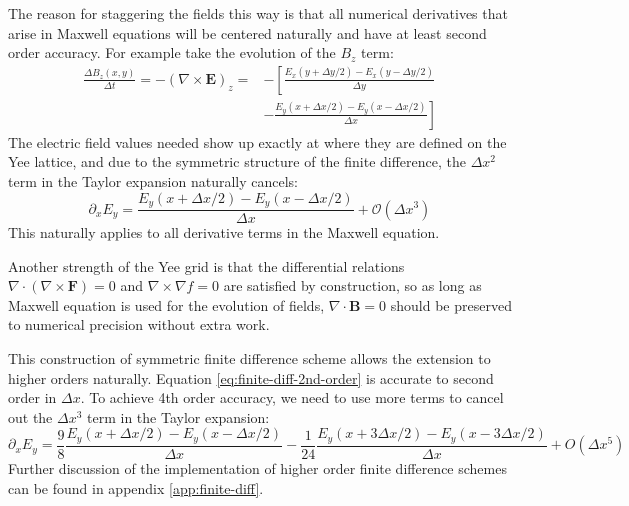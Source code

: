 The reason for staggering the fields this way is that all numerical derivatives
that arise in Maxwell equations will be centered naturally and have at least
second order accuracy. For example take the evolution of the $B_z$ term:
\begin{equation}
  \begin{split}
    \frac{\Delta B_z(x, y)}{\Delta t} = -(\nabla\times \mathbf{E})_{z} = &-\left[ \frac{E_x(y + \Delta y/2) - E_x(y - \Delta y/2)}{\Delta y} \right. \\
      &- \left.\frac{E_y(x + \Delta x/2) - E_y(x - \Delta x/2)}{\Delta x} \right]
  \end{split}
\end{equation}
The electric field values needed show up exactly at where they are defined on
the Yee lattice, and due to the symmetric structure of the finite difference,
the $\Delta x^{2}$ term in the Taylor expansion naturally cancels:
\begin{equation}
  \label{eq:finite-diff-2nd-order}
\partial_xE_y = \frac{E_y(x + \Delta x/2) - E_y(x - \Delta x/2)}{\Delta x} + \mathcal{O}(\Delta x^3)
\end{equation}
This naturally applies to all derivative terms in the Maxwell equation.

Another strength of the Yee grid is that the differential relations
$\nabla\cdot(\nabla\times \mathbf{F}) = 0$ and $\nabla \times \nabla f = 0$ are
satisfied by construction, so as long as Maxwell equation is used for the
evolution of fields, $\nabla\cdot \mathbf{B} = 0$ should be preserved to
numerical precision without extra work.

This construction of symmetric finite difference scheme allows the extension to
higher orders naturally. Equation \eqref{eq:finite-diff-2nd-order} is accurate
to second order in $\Delta x$. To achieve 4th order accuracy, we need to use
more terms to cancel out the $\Delta x^{3}$ term in the Taylor expansion:
\begin{equation}
  \label{eq:finite-diff-4th-order}
  \partial_{x}E_y = \frac{9}{8}\frac{E_y(x + \Delta x/2) - E_y(x - \Delta x / 2)}{\Delta x} - \frac{1}{24}\frac{E_y(x + 3\Delta x / 2) - E_y(x - 3\Delta x / 2)}{\Delta x} + O(\Delta x^5)
\end{equation}
Further discussion of the implementation of higher order finite difference
schemes can be found in appendix \ref{app:finite-diff}.

